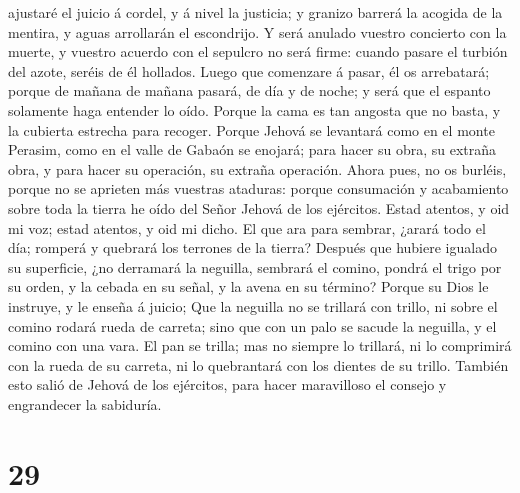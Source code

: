 ajustaré el juicio á cordel, y á nivel la justicia; y granizo barrerá la
acogida de la mentira, y aguas arrollarán el escondrijo.  Y
será anulado vuestro concierto con la muerte, y vuestro acuerdo con el
sepulcro no será firme: cuando pasare el turbión del azote, seréis de él
hollados.  Luego que comenzare á pasar, él os arrebatará;
porque de mañana de mañana pasará, de día y de noche; y será que el
espanto solamente haga entender lo oído.  Porque la cama es
tan angosta que no basta, y la cubierta estrecha para recoger.
 Porque Jehová se levantará como en el monte Perasim, como
en el valle de Gabaón se enojará; para hacer su obra, su extraña obra, y
para hacer su operación, su extraña operación.  Ahora pues,
no os burléis, porque no se aprieten más vuestras ataduras: porque
consumación y acabamiento sobre toda la tierra he oído del Señor Jehová
de los ejércitos.  Estad atentos, y oid mi voz; estad
atentos, y oid mi dicho.  El que ara para sembrar, ¿arará
todo el día; romperá y quebrará los terrones de la tierra? 
Después que hubiere igualado su superficie, ¿no derramará la neguilla,
sembrará el comino, pondrá el trigo por su orden, y la cebada en su
señal, y la avena en su término?  Porque su Dios le
instruye, y le enseña á juicio;  Que la neguilla no se
trillará con trillo, ni sobre el comino rodará rueda de carreta; sino
que con un palo se sacude la neguilla, y el comino con una vara.
 El pan se trilla; mas no siempre lo trillará, ni lo
comprimirá con la rueda de su carreta, ni lo quebrantará con los dientes
de su trillo.  También esto salió de Jehová de los
ejércitos, para hacer maravilloso el consejo y engrandecer la sabiduría.

\hypertarget{section-28}{%
\section{29}\label{section-28}}

